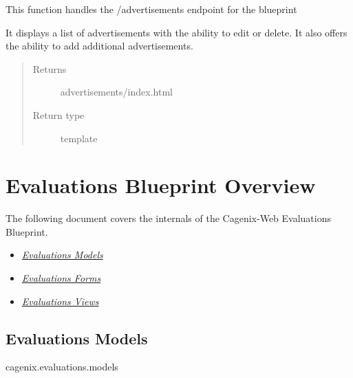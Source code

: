 \documentclass[letterpaper,10pt,english]{sphinxmanual}
\begin{document}

\begin{fulllineitems}
\label{dev-advertisements:cagenix.advertisements.views.home}
This function handles the /advertisements endpoint for the blueprint

It displays a list of advertisements with the ability to edit or
delete. It also offers the ability to add additional advertisements.
\begin{quote}\begin{description}
\item[{Returns}] \leavevmode
advertisements/index.html

\item[{Return type}] \leavevmode
template

\end{description}\end{quote}

\end{fulllineitems}



\chapter{Evaluations Blueprint Overview}
\label{dev-evaluations::doc}\label{dev-evaluations:evaluations-blueprint-overview}
The following document covers the internals of the Cagenix-Web Evaluations
Blueprint.
\begin{itemize}
\item {} 
{\hyperref[dev-evaluations:evaluations-models-label]{\emph{Evaluations Models}}}

\item {} 
{\hyperref[dev-evaluations:evaluations-forms-label]{\emph{Evaluations Forms}}}

\item {} 
{\hyperref[dev-evaluations:evaluations-views-label]{\emph{Evaluations Views}}}

\end{itemize}


\section{Evaluations Models}
\label{dev-evaluations:evaluations-models-label}\label{dev-evaluations:module-cagenix.evaluations.models}\label{dev-evaluations:evaluations-models}
cagenix.evaluations.models
\end{document}
